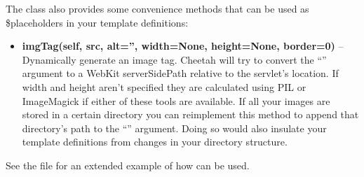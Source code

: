 
The class also provides some convenience methods that can be used as
\$placeholders in your template definitions:

\begin{itemize}
\item {\bf imgTag(self, src, alt='', width=None, height=None, border=0)} --
     Dynamically generate an image tag.  Cheetah will try to convert the
     ``'' argument to a WebKit serverSidePath relative to the
     servlet's location. If width and height aren't specified they are
     calculated using PIL or ImageMagick if either of these tools are available.
     If all your images are stored in a certain directory you can reimplement
     this method to append that directory's path to the ``'' argument.
     Doing so would also insulate your template definitions from changes in your
     directory structure.
\end{itemize}

See the file 
for an extended example of how  can be used.



